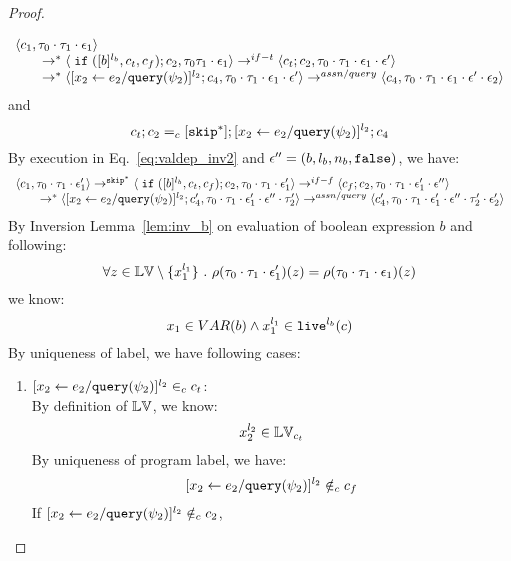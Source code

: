 {\begin{proof}
\begin{subproof}
\[\begin{array}{l}
  \langle c_1, \mathtt{\tau}_0 \cdot \mathtt{\tau}_1 \cdot \mathtt{\epsilon}_1 \rangle 
  \\
  \qquad \rightarrow^{*} 
  \langle \;\mathtt{if}\; ([b]^{l_b}, c_t, c_f);{c}_2, \mathtt{\tau}_0 \mathtt{\tau}_1 \cdot \mathtt{\epsilon}_1 \rangle 
  \rightarrow^{if-t} 
  \langle c_t;c_2, \mathtt{\tau}_0 \cdot \mathtt{\tau}_1 \cdot \mathtt{\epsilon}_1 \cdot \mathtt{\epsilon}' \rangle 
  \\
  \qquad \rightarrow^{*} 
  \langle [\mathrel{ {x}_2 \leftarrow e_2 / {\tt query}(\psi_2) }]^{l_2};{c}_4, 
  \mathtt{\tau}_0 \cdot \mathtt{\tau}_1 \cdot \mathtt{\epsilon}_1 \cdot \mathtt{\epsilon}' \rangle 
  \rightarrow^{assn/query} 
  \langle {c}_4,  \mathtt{\tau}_0 \cdot \mathtt{\tau}_1 \cdot \mathtt{\epsilon}_1 \cdot \mathtt{\epsilon}' \cdot \mathtt{\epsilon}_2 \rangle 
  \end{array}
\]
and 
\[
  c_t;c_2 =_c [\mathtt{skip}^*]; [\mathrel{ {x}_2 \leftarrow e_2 / {\tt query}(\psi_2) }]^{l_2};{c}_4
\]
%
By execution in Eq.~\ref{eq:valdep_inv2} and $\mathtt{\epsilon}'' = (b, l_b, n_b, \mathtt{false})$, we have:
\begin{equation}
\label{eq:m1testif_inv2}
  \begin{array}{l}   
  \langle c_1, \mathtt{\tau}_0 \cdot \mathtt{\tau}_1 \cdot \mathtt{\epsilon}_1' \rangle 
  \rightarrow^{\mathtt{skip}^*} 
  \langle \;\mathtt{if}\; ([b]^{l_b}, c_t, c_f); {c}_2, \mathtt{\tau}_0 \cdot \mathtt{\tau}_1 \cdot \mathtt{\epsilon}_1' \rangle 
  \rightarrow^{if-f} 
  \langle c_f;c_2, \mathtt{\tau}_0 \cdot \mathtt{\tau}_1 \cdot \mathtt{\epsilon}_1' \cdot \mathtt{\epsilon}'' \rangle 
  \\
  \qquad \rightarrow^{*} 
  \langle [\mathrel{ {x}_2 \leftarrow e_2 / {\tt query}(\psi_2) }]^{l_2};{c}_4', 
  \mathtt{\tau}_0 \cdot \mathtt{\tau}_1 \cdot \mathtt{\epsilon}_1' \cdot \mathtt{\epsilon}'' \cdot \mathtt{\tau}_2' \rangle
  \rightarrow^{assn/query} 
  \langle {c}_4',  \mathtt{\tau}_0 \cdot \mathtt{\tau}_1 \cdot \mathtt{\epsilon}_1' \cdot \mathtt{\epsilon}'' \cdot \mathtt{\tau}_2' \cdot \mathtt{\epsilon}_2' \rangle 
\end{array}
\end{equation}
By Inversion Lemma~\ref{lem:inv_b} on evaluation of boolean expression $b$ and following: 
\[
  \forall z \in \mathbb{LV} \setminus \{x_1^{l_1}\} ~.~
  \rho(\mathtt{\tau}_0 \cdot \mathtt{\tau}_1 \cdot \mathtt{\epsilon}_1')(z) = \rho(\mathtt{\tau}_0 \cdot \mathtt{\tau}_1 \cdot \mathtt{\epsilon}_1)(z)
\]
we know:
\[
  x_1 \in VAR(b) \land x_1^{l_1} \in \mathtt{live}^{l_b}(c)
\]
%
 By uniqueness of label, we have following cases:
 \begin{enumerate}
 \item $[\mathrel{ {x}_2 \leftarrow e_2 / {\tt query}(\psi_2) }]^{l_2} \in_c c_t$:
\\
By definition of $\mathbb{LV}$, we know:
\[
  x_2^{l_2} \in \mathbb{LV}_{c_t}
\]
%
 By uniqueness of program label, we have:
 \[
 [\mathrel{ {x}_2 \leftarrow e_2 / {\tt query}(\psi_2) }]^{l_2} \notin_c c_f
 \]
 If $[\mathrel{ {x}_2 \leftarrow e_2 / {\tt query}(\psi_2) }]^{l_2} \notin_c c_2$,

\end{enumerate}
\end{subproof}
\end{proof}}
